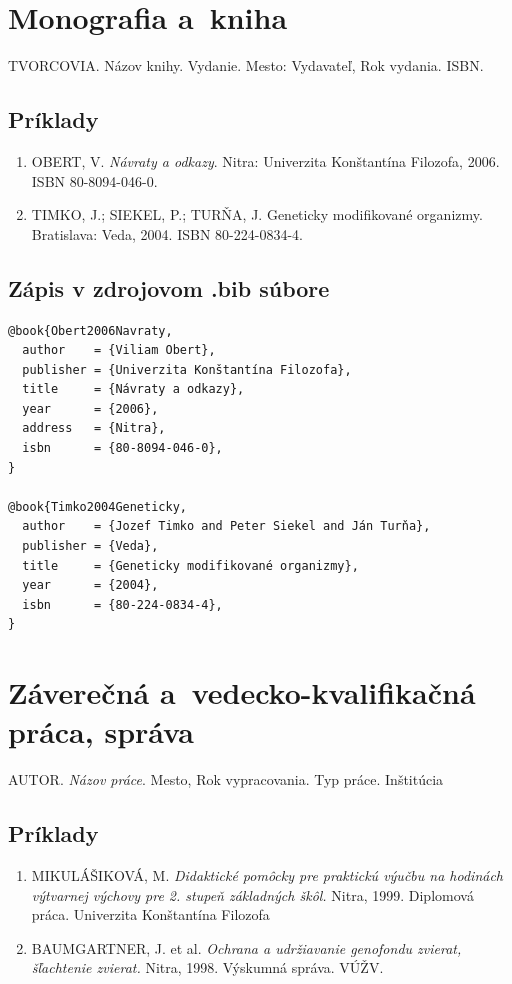 \section{Monografia a~kniha}
\begin{trivlist}
\item TVORCOVIA. Názov knihy. Vydanie. Mesto: Vydavateľ, Rok vydania. ISBN.
\end{trivlist}

\subsection*{\normalsize Príklady}
\begin{enumerate}
\item OBERT, V. \textit{Návraty a odkazy}. Nitra: Univerzita Konštantína Filozofa, 2006. ISBN 80-8094-046-0.

\item TIMKO, J.; SIEKEL, P.; TURŇA, J. Geneticky modifikované organizmy. Bratislava: Veda, 2004. ISBN 80-224-0834-4.
\end{enumerate}

\subsection*{\normalsize Zápis v zdrojovom .bib súbore}
\begin{verbatim}
@book{Obert2006Navraty,
  author    = {Viliam Obert},
  publisher = {Univerzita Konštantína Filozofa},
  title     = {Návraty a odkazy},
  year      = {2006},
  address   = {Nitra},
  isbn      = {80-8094-046-0},
}

@book{Timko2004Geneticky,
  author    = {Jozef Timko and Peter Siekel and Ján Turňa},
  publisher = {Veda},
  title     = {Geneticky modifikované organizmy},
  year      = {2004},
  isbn      = {80-224-0834-4},
}
\end{verbatim}

\section{Záverečná a~vedecko-kvalifikačná práca, správa}
AUTOR. \textit{Názov práce}. Mesto, Rok vypracovania. Typ práce. Inštitúcia

\subsection*{\normalsize Príklady}
\begin{enumerate}
  \item MIKULÁŠIKOVÁ, M. \textit{Didaktické pomôcky pre praktickú výučbu na hodinách výtvarnej výchovy pre 2. stupeň základných škôl.} Nitra, 1999. Diplomová práca. Univerzita Konštantína Filozofa

  \item BAUMGARTNER, J. et al. \textit{Ochrana a udržiavanie genofondu zvierat, šľachtenie zvierat.} Nitra, 1998. Výskumná správa. VÚŽV.
\end{enumerate}

